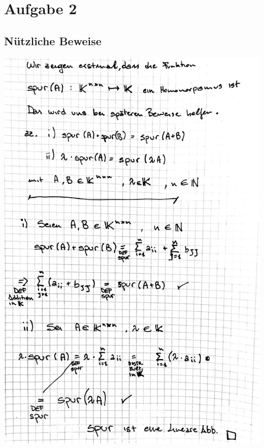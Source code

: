 \documentclass[10pt,a4paper]{article}
\begin{document}
\newpage
\section{Aufgabe 2}
\subsection{Nützliche Beweise}
\includegraphics[width=\textwidth]{lat5a_1.jpg} 
\end{document}
